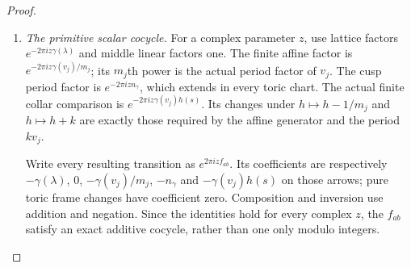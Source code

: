 \begin{proof}
\begin{enumerate}[label=\arabic*.,leftmargin=*]
For completeness, every derivative in the final coefficients is
given by the following finite recursion.  In a local inverse branch
write $\mathcal D=\partial/\partial\bar z_l$ and
$v_n=(R_n^2-\|u-c_n\|^2)/(3R_n^2/4)$.  Then
\begin{equation}\label{inv:eq:atlas-weight-derivative}
 \begin{aligned}
 \mathcal D b_n&=-\frac4{3R_n^2}\chi'(v_n)
        \sum_j(u_j-c_{n,j})\mathcal D\bar u_j,\\
 \mathcal D S_n&=\sum_{u\in\pi_n^{-1}(x)}\mathcal D b_n,
 &\mathcal D a_n&=2\chi'(2S_n)\mathcal D S_n,\\
 \mathcal D P_1&=0,
 &\mathcal D P_{n+1}&=(1-a_n)\mathcal D P_n-P_n\mathcal D a_n,\\
 R'(s)&=\frac{2s\chi'(2s)-\chi(2s)}{s^2}\quad(s>0),
 &R'(0)&=0,\\
 \mathcal D w_n&=R(S_n)b_n\mathcal D P_n
       +P_nR'(S_n)b_n\mathcal D S_n+P_nR(S_n)\mathcal D b_n.
 \end{aligned}
\end{equation}
The derivatives $\mathcal D\bar u_j$ are the conjugate Jacobians
of the explicit inverse chart maps in step~1.  Finally
\[
 \chi'(t)=
 \frac{E'(t)E(1-t)+E(t)E'(1-t)}{(E(t)+E(1-t))^2},
 \qquad E'(t)=\begin{cases}e^{-1/t}/t^2&t>0,\\0&t\le0.\end{cases}
\]
Thus no unspecified smooth correction is hidden in the coefficients.

\item \emph{The primitive scalar cocycle.}
For a complex parameter $z$, use lattice factors
$e^{-2\pi iz\gamma(\lambda)}$ and middle linear factors one.
The finite affine factor is
$e^{-2\pi iz\gamma(v_j)/m_j}$; its $m_j$th power is the actual
period factor of $v_j$.  The cusp period factor is
$e^{-2\pi izn_\gamma}$, which extends in every toric chart.
The actual finite collar comparison is
$e^{-2\pi iz\gamma(v_j)h(s)}$.
Its changes under $h\mapsto h-1/m_j$ and $h\mapsto h+k$ are
exactly those required by the affine generator and the period $kv_j$.

Write every resulting transition as $e^{2\pi iz f_{ab}}$.
Its coefficients are respectively
$-\gamma(\lambda)$, $0$, $-\gamma(v_j)/m_j$,
$-n_\gamma$ and $-\gamma(v_j)h(s)$ on those arrows;
pure toric frame changes have coefficient zero.
Composition and inversion use addition and negation.
Since the identities hold for every complex $z$, the $f_{ab}$
satisfy an exact additive cocycle, rather than one only modulo
integers.


\end{enumerate}
\end{proof}
